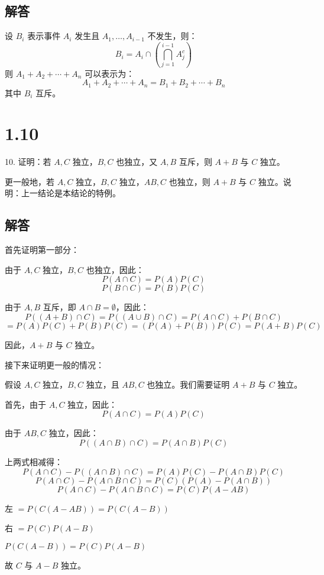 \documentclass[UTF8]{report}
\theoremstyle{MyLineTheoremStyle} %
\theoremstyle{MyBlockTheoremStyle} %
\theoremstyle{MySubsubsectionStyle} %
\begin{document}
\subsection*{解答}

设 \(B_i\) 表示事件 \(A_i\) 发生且 \(A_1, \ldots, A_{i-1}\) 不发生，则：
\[
B_i = A_i \cap \left( \bigcap_{j=1}^{i-1} A_j^c \right)
\]
则 \(A_1 + A_2 + \cdots + A_n\) 可以表示为：
\[
A_1 + A_2 + \cdots + A_n = B_1 + B_2 + \cdots + B_n
\]
其中 \(B_i\) 互斥。

\section{1.10}

10. 证明：若 \(A, C\) 独立，\(B, C\) 也独立，又 \(A, B\) 互斥，则 \(A + B\) 与 \(C\) 独立。\par
更一般地，若 \(A, C\) 独立，\(B, C\) 独立，\(AB, C\) 也独立，则 \(A + B\) 与 \(C\) 独立。说明：上一结论是本结论的特例。

\subsection*{解答}

首先证明第一部分：

由于 \(A, C\) 独立，\(B, C\) 也独立，因此：
\[
P(A \cap C) = P(A)P(C)
\]
\[
P(B \cap C) = P(B)P(C)
\]

由于 \(A, B\) 互斥，即 \(A \cap B = \emptyset\)，因此：
\[
P((A + B) \cap C) = P((A \cup B) \cap C) = P(A \cap C) + P(B \cap C)
\]
\[
= P(A)P(C) + P(B)P(C) = (P(A) + P(B))P(C) = P(A + B)P(C)
\]

因此，\(A + B\) 与 \(C\) 独立。

接下来证明更一般的情况：

假设 \(A, C\) 独立，\(B, C\) 独立，且 \(AB, C\) 也独立。我们需要证明 \(A + B\) 与 \(C\) 独立。

首先，由于 \(A, C\) 独立，因此：
\[
P(A \cap C) = P(A)P(C)
\]

由于 \(AB, C\) 独立，因此：
\[
P((A \cap B) \cap C) = P(A \cap B)P(C)
\]

上两式相减得：
\[
P(A \cap C) - P((A \cap B) \cap C) = P(A)P(C) - P(A \cap B)P(C)
\]
\[
P(A \cap C) - P(A \cap B \cap C) = P(C)(P(A) - P(A \cap B))
\]
\[
P(A \cap C) - P(A \cap B \cap C) = P(C)P(A - AB)
\]\par
左 $= P(C(A - AB)) = P(C(A - B))$\par
右 $= P(C)P(A - B)$\par
$P(C(A - B)) = P(C)P(A - B)$\par
故 \(C\) 与 \(A - B\) 独立。
\end{document}
